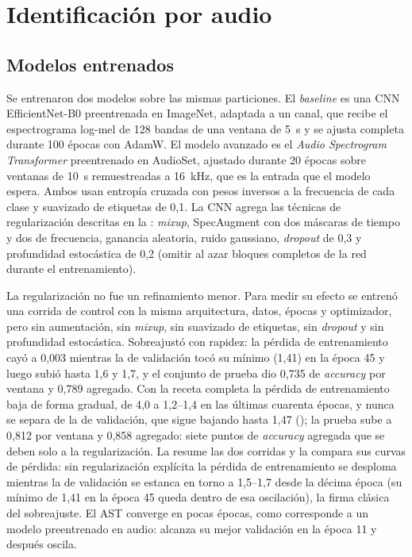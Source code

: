 \section{Identificación por audio}\label{sec:res-audio}

\subsection{Modelos entrenados}

Se entrenaron dos modelos sobre las mismas particiones. El \textit{baseline}
es una CNN EfficientNet-B0 preentrenada en ImageNet, adaptada a un canal, que
recibe el espectrograma log-mel de 128 bandas de una ventana de
\SI{5}{\second} y se ajusta completa durante 100 épocas con AdamW. El
modelo avanzado es el \textit{Audio Spectrogram Transformer} preentrenado en
AudioSet, ajustado durante 20 épocas sobre ventanas de \SI{10}{\second}
remuestreadas a \SI{16}{\kilo\hertz}, que es la entrada que el modelo
espera. Ambos usan entropía cruzada con pesos inversos a la frecuencia de
cada clase y suavizado de etiquetas de 0,1. La CNN agrega las técnicas de
regularización descritas en la :
\textit{mixup}, SpecAugment con dos máscaras de tiempo y dos de frecuencia,
ganancia aleatoria, ruido gaussiano, \textit{dropout} de 0,3 y profundidad
estocástica de 0,2 (omitir al azar bloques completos de la red durante el
entrenamiento).

La regularización no fue un refinamiento menor. Para medir su efecto se
entrenó una corrida de control con la misma arquitectura, datos, épocas y
optimizador, pero sin aumentación, sin \textit{mixup}, sin suavizado de
etiquetas, sin \textit{dropout} y sin profundidad estocástica. Sobreajustó
con rapidez: la pérdida de entrenamiento cayó a 0,003 mientras la de
validación tocó su mínimo (1,41) en la época 45 y luego subió hasta 1,6 y
1,7, y el conjunto de prueba dio 0,735 de \textit{accuracy} por ventana y
0,789 agregado. Con la receta completa la pérdida de entrenamiento baja de
forma gradual, de 4,0 a 1,2--1,4 en las últimas cuarenta épocas, y nunca se
separa de la de validación, que sigue bajando hasta 1,47
(); la prueba sube a 0,812 por ventana y 0,858 agregado:
siete puntos de \textit{accuracy} agregada que se deben solo a la
regularización. La  resume las dos corridas y la
 compara sus curvas de pérdida: sin regularización
explícita la pérdida de entrenamiento se desploma mientras la de validación
se estanca en torno a 1,5--1,7 desde la décima época (su mínimo de 1,41 en la
época 45 queda dentro de esa oscilación), la firma clásica del sobreajuste.
El AST converge en pocas épocas, como
corresponde a un modelo preentrenado en audio: alcanza su mejor validación
en la época 11 y después oscila.

